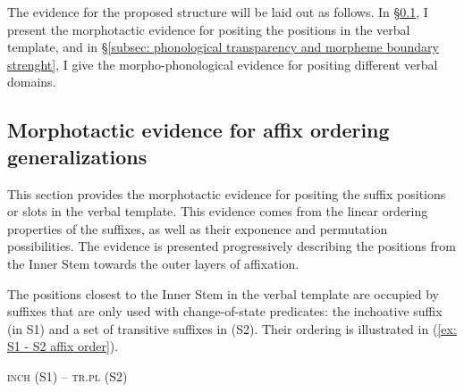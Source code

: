The evidence for the proposed structure will be laid out as follows. In §\ref{subsec: morphotactic evidence for affix order generalizations}, I present the morphotactic evidence for positing the positions in the verbal template, and in §\ref{subsec: phonological transparency and morpheme boundary strenght}, I give the morpho-phonological evidence for positing different verbal domains.

\subsection{Morphotactic evidence for affix ordering generalizations}
\label{subsec: morphotactic evidence for affix order generalizations}
\largerpage
This section provides the morphotactic evidence for positing the suffix positions or slots in the verbal template. This evidence comes from the linear ordering properties of the suffixes, as well as their exponence and permutation possibilities. The evidence is presented progressively describing the positions from the Inner Stem towards the outer layers of affixation.

The positions closest to the Inner Stem in the verbal template are occupied by suffixes that are only used with change-of-state predicates: the inchoative suffix (in S1) and a set of transitive suffixes in (S2). Their ordering is illustrated in (\ref{ex: S1 - S2  affix order}).

\ea\label{ex: S1 - S2  affix order}
{\textsc{inch} (S1) -- \textsc{tr.pl} (S2)}

